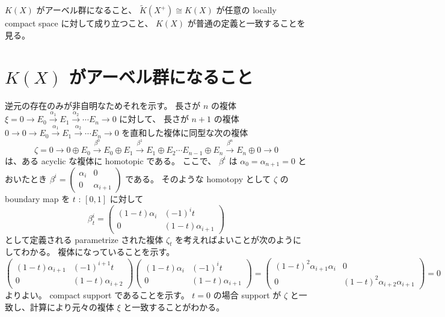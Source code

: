 \documentclass[dvipdfmx]{jsarticle}
\begin{document}
\(K(X)\) がアーベル群になること、 \(\tilde{K}(X^{+}) \cong K(X)\) が任意の locally compact space に対して成り立つこと、 \(K(X)\) が普通の定義と一致することを見る。

\section{\(K(X)\) がアーベル群になること}
\begin{Proof}
\itemprof
  逆元の存在のみが非自明なためそれを示す。
  長さが \(n\) の複体　\(\xi = 0 \to E_0 \overset{\alpha_1}{\to} E_1 \overset{\alpha_2}{\to} \cdots E_n \to 0\) に対して、 長さが \(n+1\) の複体 \(0 \to 0 \to E_0 \overset{\alpha_1}{\to} E_1 \overset{\alpha_2}{\to} \cdots E_n \to 0\) を直和した複体に同型な次の複体
  \[
    \zeta = 0 \to 0 \oplus E_0 \overset{\beta^0}{\to} E_0 \oplus E_1 \overset{\beta^1}{\to} E_1 \oplus E_2 \cdots E_{n-1} \oplus E_n \overset{\beta^n}{\to} E_n \oplus 0 \to 0
  \]
  は、ある acyclic な複体に homotopic である。
  ここで、 \(\beta^i\) は \(\alpha_0 = \alpha_{n+1} = 0\) とおいたとき
  \(\beta^i = \begin{pmatrix}
    \alpha_i & 0 \\
    0 & \alpha_{i+1} 
  \end{pmatrix}\) である。
  そのような homotopy として \(\zeta\) の boundary map を \(t\) : \([0,1]\) に対して
  \[
    \beta^i_t = \begin{pmatrix}
    (1-t) \alpha_i & (-1)^i t \\
    0 & (1-t)\alpha_{i+1}
    \end{pmatrix}
  \]
  として定義される parametrize された複体 \(\zeta_t\) を考えればよいことが次のようにしてわかる。
\itemprof
  複体になっていることを示す。
  \[\begin{pmatrix}
    (1-t) \alpha_{i+1} & (-1)^{i+1} t \\
    0 & (1-t)\alpha_{i+2}
  \end{pmatrix} \begin{pmatrix}
    (1-t) \alpha_{i} & (-1)^{i} t \\
    0 & (1-t)\alpha_{i+1}
  \end{pmatrix} = \begin{pmatrix}
    (1-t)^2 \alpha_{i+1} \alpha_{i} & 0 \\
    0 & (1-t)^2 \alpha_{i+2} \alpha_{i+1}
  \end{pmatrix} = 0\] よりよい。
\itemprof
  compact support であることを示す。
  \(t=0\) の場合 support が \(\zeta\) と一致し、計算により元々の複体 \(\xi\) と一致することがわかる。

\end{Proof}
\end{document}
